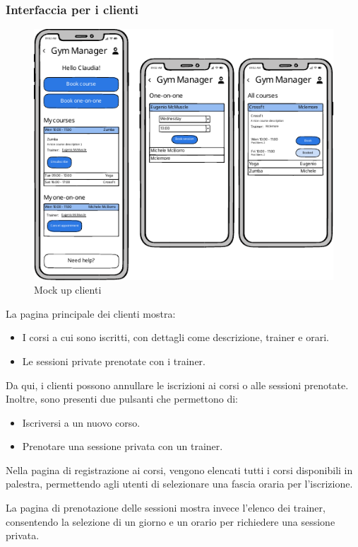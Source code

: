 \documentclass{report}
\begin{document}
\subsubsection{Interfaccia per i clienti}
\begin{figure}[h!]
    \centering
    \includegraphics[scale=1.5]{user-mockups.pdf}
    \caption{Mock up clienti}
    \label{fig:deathstar}
\end{figure}
    
\par La pagina principale dei clienti mostra:
\begin{itemize}
    \item I corsi a cui sono iscritti, con dettagli come descrizione, trainer e orari.
    \item Le sessioni private prenotate con i trainer.
\end{itemize}
\par Da qui, i clienti possono annullare le iscrizioni ai corsi o alle sessioni prenotate. Inoltre, sono presenti due pulsanti che permettono di:
\begin{itemize}
    \item Iscriversi a un nuovo corso.
    \item Prenotare una sessione privata con un trainer.
\end{itemize}
\par Nella pagina di registrazione ai corsi, vengono elencati tutti i corsi disponibili in palestra, permettendo agli utenti di selezionare una fascia oraria per l'iscrizione.
\par La pagina di prenotazione delle sessioni mostra invece l'elenco dei trainer, consentendo la selezione di un giorno e un orario per richiedere una sessione privata.
\end{document}

